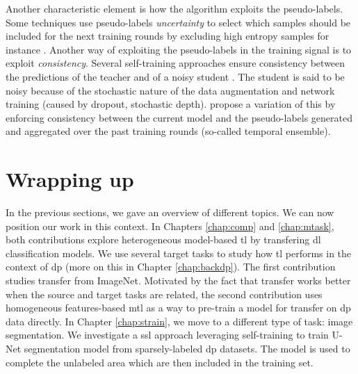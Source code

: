 Another characteristic element is how the algorithm exploits the pseudo-labels. Some techniques use pseudo-labels \textit{uncertainty} to select which samples should be included for the next training rounds by excluding high entropy samples for instance \cite{grandvalet2004semi, lee2013pseudo}. Another way of exploiting the pseudo-labels in the training signal is to exploit \textit{consistency}. Several self-training approaches ensure consistency between the predictions of the teacher and of a noisy student \cite{xie2020self, zhu2020improving, sohn2020fixmatch, tarvainen2017mean}. The student is said to be noisy because of the stochastic nature of the data augmentation and network training (\eg caused by dropout, stochastic depth). \cite{laine2016temporal} propose a variation of this by enforcing consistency between the current model and the pseudo-labels generated and aggregated over the past training rounds (so-called temporal ensemble).

\section{Wrapping up}
\label{sec:backml:wrapup}

In the previous sections, we gave an overview of different topics. We can now position our work in this context. In Chapters \ref{chap:comp}
and \ref{chap:mtask}, both contributions explore heterogeneous model-based
\acrlong{tl} by transfering \acrlong{dl} classification models. We use several
target tasks to study how \acrlong{tl} performs in the context of \acrlong{dp}
(more on this in Chapter \ref{chap:backdp}). The first contribution studies transfer
from ImageNet. Motivated by the fact that transfer works better when the source
and target tasks are related, the second contribution uses homogeneous features-based
\acrlong{mtl} as a way to pre-train a model for transfer on \acrlong{dp} data
directly. In Chapter \ref{chap:strain}, we move to a different type of task: image segmentation.
We investigate a \acrlong{ssl} approach leveraging self-training to train U-Net segmentation
model from sparsely-labeled \acrlong{dp} datasets. The model is used to complete the unlabeled area which are 
then included in the training set. 
